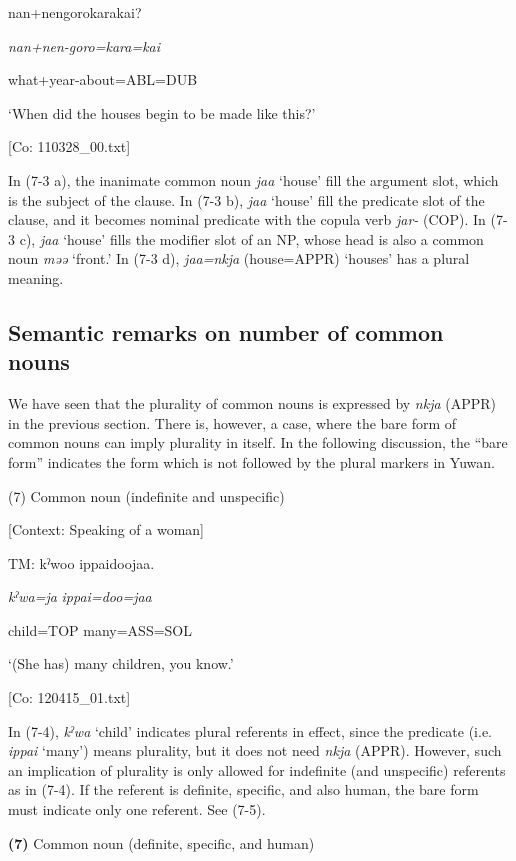       {\textbar}nan+nengoro{\textbar}karakai?

      \textit{nan+nen-goro=kara=kai}

      what+year-about=ABL=DUB

      ‘When did the houses begin to be made like this?’

      [Co: 110328\_00.txt]

In (7-3 a), the inanimate common noun \textit{jaa} ‘house’ fill the argument slot, which is the subject of the clause. In (7-3 b), \textit{jaa} ‘house’ fill the predicate slot of the clause, and it becomes nominal predicate with the copula verb \textit{jar-} (COP). In (7-3 c), \textit{jaa} ‘house’ fills the modifier slot of an NP, whose head is also a common noun \textit{məə} ‘front.’ In (7-3 d), \textit{jaa=nkja} (house=APPR) ‘houses’ has a plural meaning.

\subsection{Semantic remarks on number of common nouns}

We have seen that the plurality of common nouns is expressed by \textit{nkja} (APPR) in the previous section. There is, however, a case, where the bare form of common nouns can imply plurality in itself. In the following discussion, the “bare form” indicates the form which is not followed by the plural markers in Yuwan.

(7)  Common noun (indefinite and unspecific)

  [Context: Speaking of a woman]

  TM:  kˀwoo  ippaidoojaa.

    \textit{kˀwa=ja}  \textit{ippai=doo=jaa}

    child=TOP  many=ASS=SOL

    ‘(She has) many children, you know.’

    [Co: 120415\_01.txt]

In (7-4), \textit{kˀwa} ‘child’ indicates plural referents in effect, since the predicate (i.e. \textit{ippai} ‘many’) means plurality, but it does not need \textit{nkja} (APPR). However, such an implication of plurality is only allowed for indefinite (and unspecific) referents as in (7-4). If the referent is definite, specific, and also human, the bare form must indicate only one referent. See (7-5).

\textbf{(7)}  Common noun (definite, specific, and human)

